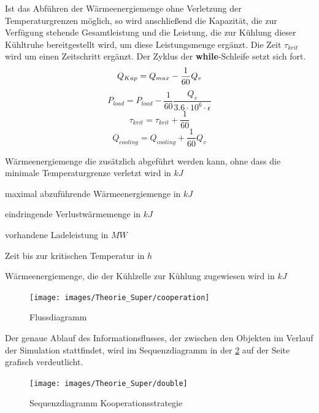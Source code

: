 \begin{description}
Ist das Abf\"uhren der W\"armeenergiemenge ohne Verletzung der Temperaturgrenzen
m\"oglich, so wird anschlie\ss end die Kapazit\"at, die zur Verf\"ugung
stehende Gesamtleistung und die Leistung, die zur K\"uhlung dieser K\"uhltruhe
bereitgestellt wird, um diese Leistungsmenge erg\"anzt. Die Zeit $\tau_{krit}$
wird um einen Zeitschritt erg\"anzt. Der Zyklus der \textbf{while}-Schleife
setzt sich fort.
\begin{equation*}
	Q_{Kap} = Q_{max} - \frac{1}{60}Q_v\\
\end{equation*}
\begin{equation*}
	P_{load} = P_{load} - \frac{1}{60}\frac{Q_v }{3.6 \cdot 10^{6} \cdot
	\epsilon}
\end{equation*}
\begin{equation*}
	\tau_{krit} = \tau_{krit} + \frac{1}{60}
\end{equation*}
\begin{equation*}
	Q_{cooling} = Q_{cooling} + \frac{1}{60}Q_v
\end{equation*}
\begin{description}[\dth]
\item[$Q_{Kap}$] W\"armeenergiemenge die zus\"atzlich abgef\"uhrt werden kann,
ohne dass die minimale Temperaturgrenze verletzt wird in $kJ$
\item[$Q_{max}$] maximal abzuf\"uhrende W\"armeenergiemenge in $kJ$
\item[$Q_{v}$] eindringende Verlustw\"armemenge in $kJ$
\item[$P_{load}$] vorhandene Ladeleistung in $MW$
\item[$\tau_{krit}$] Zeit bis zur kritischen Temperatur in $h$
\item[$Q_{cooling}$] W\"armeenergiemenge, die der K\"uhlzelle zur K\"uhlung
zugewiesen wird in $kJ$
\end{description} \vspace{0.5cm}
\end{description}


\begin{figure}[h!]
	\begin{center}
	\texttt{[image: images/Theorie\_Super/cooperation]}
	\end{center}
\caption{Flussdiagramm}
\label{fig:coop}
\end{figure}

Der genaue Ablauf des Informationsflusses, der zwischen den Objekten im Verlauf
der Simulation stattfindet, wird im Sequenzdiagramm in der \cref{fig:uml_coop}
auf der Seite \pageref{fig:uml_coop} grafisch verdeutlicht.
\begin{figure}[h]
	\begin{center}
	\texttt{[image: images/Theorie\_Super/double]}
	\end{center}
\caption{Sequenzdiagramm Kooperationsstrategie}
\label{fig:uml_coop}
\end{figure}



